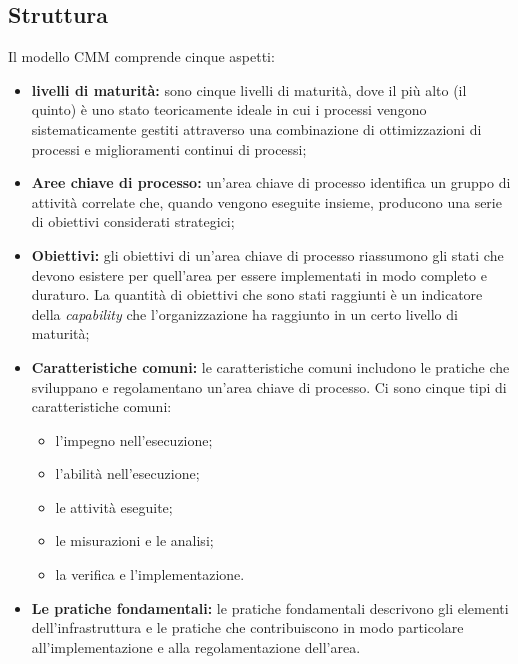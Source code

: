 	\subsection{Struttura}
		Il modello CMM comprende cinque aspetti:
		\begin{itemize}
			\item \textbf{livelli di maturità:} sono cinque livelli di maturità, dove il più alto (il quinto) è uno stato teoricamente ideale in cui i processi vengono sistematicamente gestiti attraverso una combinazione di ottimizzazioni di processi e miglioramenti continui di processi;
			\item \textbf{Aree chiave di processo:} un'area chiave di processo identifica un gruppo di attività correlate che, quando vengono eseguite insieme, producono una serie di obiettivi considerati strategici;
			\item \textbf{Obiettivi:} gli obiettivi di un'area chiave di processo riassumono gli stati che devono esistere per quell'area  per essere implementati in modo completo e duraturo. La quantità di obiettivi che sono stati raggiunti è un indicatore della \textit{capability} che l'organizzazione ha raggiunto in un certo livello di maturità;
			\item \textbf{Caratteristiche comuni:} le caratteristiche comuni includono le pratiche che sviluppano e regolamentano un'area chiave di processo. Ci sono cinque tipi di caratteristiche comuni:
			\begin{itemize}
				\item l'impegno nell'esecuzione;
				\item l'abilità nell'esecuzione;
				\item le attività eseguite;
				\item le misurazioni e le analisi;
				\item la verifica e l'implementazione.
			\end{itemize}
			\item \textbf{Le pratiche fondamentali:} le pratiche fondamentali descrivono gli elementi dell'infrastruttura e le pratiche che contribuiscono in modo particolare all'implementazione e alla regolamentazione dell'area.
		\end{itemize}
